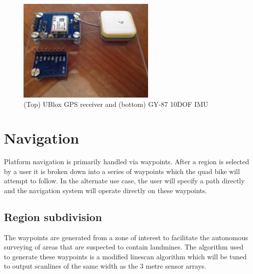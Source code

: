 \documentclass[main.tex]{subfiles}
\begin{document}
\begin{figure}[ht]
\includegraphics[width=0.6\textwidth]{4-DetailedDesign/Positioning.jpg}
\centering
\caption[UBlox GPS receiver and GY-87 10DOF IMU]{(Top) UBlox GPS receiver and (bottom) GY-87 10DOF IMU} 
\end{figure}

\section{Navigation}
Platform navigation is primarily handled via waypoints. After a region is selected by a user it is broken down into a series of waypoints which the quad bike will attempt to follow. In the alternate use case, the user will specify a path directly and the navigation system will operate directly on these waypoints.

\subsection{Region subdivision}
The waypoints are generated from a zone of interest to facilitate the autonomous surveying of areas that are suspected to contain landmines. The algorithm used to generate these waypoints is a modified linescan algorithm which will be tuned to output scanlines of the same width as the 3 metre sensor arrays.
\end{document}
